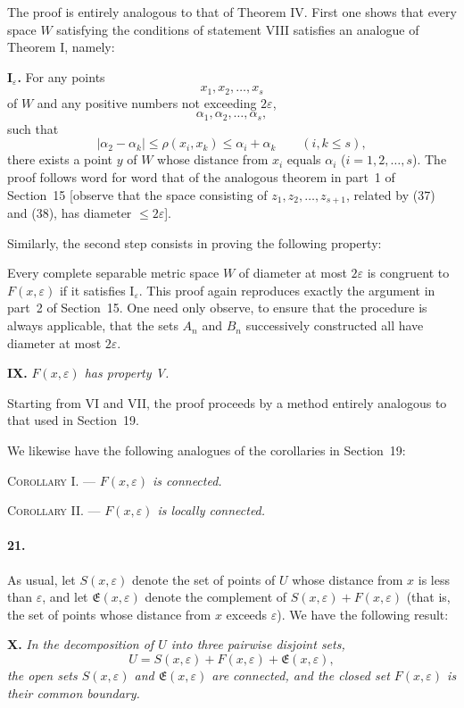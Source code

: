 \documentclass[a4paper,12pt]{amsart}
\newcommand{\srcpage}[1]{} %
\begin{document}
The proof is entirely analogous to that of Theorem IV. First one shows that every space $W$ satisfying the conditions of statement VIII satisfies an analogue of Theorem I, namely:

\textbf{I$_\varepsilon$.} For any points
\[x_1,x_2,\ldots,x_s\]
of $W$ and any positive numbers not exceeding $2\varepsilon$,
\[\alpha_1,\alpha_2,\ldots,\alpha_s,\]
such that
\[|\alpha_2-\alpha_k|\le\rho(x_i,x_k)\le\alpha_i+\alpha_k\qquad(i,k\le s),\]
there exists a point $y$ of $W$ whose distance from $x_i$ equals $\alpha_i$ ($i=1,2,\ldots,s$). The proof follows word for word that of the analogous theorem in part~1 of Section~15 [observe that the space consisting of $z_1,z_2,\ldots,z_{s+1}$, related by (37) and (38), has diameter $\le2\varepsilon$].

Similarly, the second step consists in proving the following property:

Every complete separable metric space $W$ of diameter at most $2\varepsilon$ is congruent to $F(x,\varepsilon)$ if it satisfies I$_\varepsilon$. This proof again reproduces exactly the argument in part~2 of Section~15. One need only observe, to ensure that the procedure is always applicable, that the sets $A_n$ and $B_n$ successively constructed all have diameter at most $2\varepsilon$.

\srcpage{85}
\textbf{IX.} \textit{$F(x,\varepsilon)$ has property V.}

Starting from VI and VII, the proof proceeds by a method entirely analogous to that used in Section~19.

We likewise have the following analogues of the corollaries in Section~19:

\textsc{Corollary I.} --- \textit{$F(x,\varepsilon)$ is connected.}

\textsc{Corollary II.} --- \textit{$F(x,\varepsilon)$ is locally connected.}

\paragraph{21.}
As usual, let $S(x,\varepsilon)$ denote the set of points of $U$ whose distance from $x$ is less than $\varepsilon$, and let $\mathfrak{E}(x,\varepsilon)$ denote the complement of $S(x,\varepsilon)+F(x,\varepsilon)$ (that is, the set of points whose distance from $x$ exceeds $\varepsilon$). We have the following result:

\textbf{X.} \textit{In the decomposition of $U$ into three pairwise disjoint sets,}
\[U=S(x,\varepsilon)+F(x,\varepsilon)+\mathfrak{E}(x,\varepsilon),\]
\textit{the open sets $S(x,\varepsilon)$ and $\mathfrak{E}(x,\varepsilon)$ are connected, and the closed set $F(x,\varepsilon)$ is their common boundary.}
\end{document}

